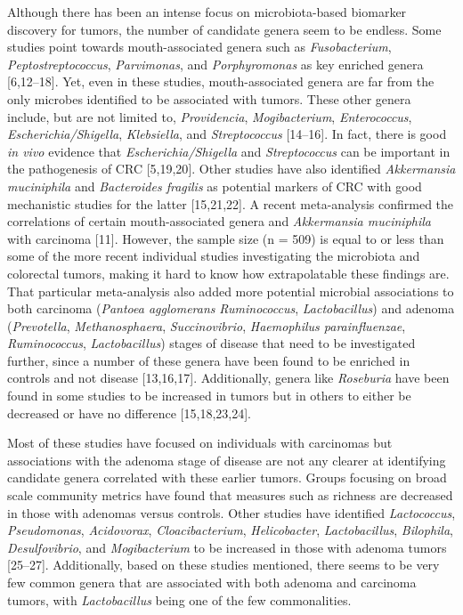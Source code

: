 \documentclass[12pt,]{article}
\begin{document}
Although there has been an intense focus on microbiota-based biomarker
discovery for tumors, the number of candidate genera seem to be endless.
Some studies point towards mouth-associated genera such as
\emph{Fusobacterium}, \emph{Peptostreptococcus}, \emph{Parvimonas}, and
\emph{Porphyromonas} as key enriched genera {[}6,12--18{]}. Yet, even in
these studies, mouth-associated genera are far from the only microbes
identified to be associated with tumors. These other genera include, but
are not limited to, \emph{Providencia}, \emph{Mogibacterium},
\emph{Enterococcus}, \emph{Escherichia/Shigella}, \emph{Klebsiella}, and
\emph{Streptococcus} {[}14--16{]}. In fact, there is good \emph{in vivo}
evidence that \emph{Escherichia/Shigella} and \emph{Streptococcus} can
be important in the pathogenesis of CRC {[}5,19,20{]}. Other studies
have also identified \emph{Akkermansia muciniphila} and
\emph{Bacteroides fragilis} as potential markers of CRC with good
mechanistic studies for the latter {[}15,21,22{]}. A recent
meta-analysis confirmed the correlations of certain mouth-associated
genera and \emph{Akkermansia muciniphila} with carcinoma {[}11{]}.
However, the sample size (n = 509) is equal to or less than some of the
more recent individual studies investigating the microbiota and
colorectal tumors, making it hard to know how extrapolatable these
findings are. That particular meta-analysis also added more potential
microbial associations to both carcinoma (\emph{Pantoea agglomerans}
\emph{Ruminococcus}, \emph{Lactobacillus}) and adenoma
(\emph{Prevotella}, \emph{Methanosphaera}, \emph{Succinovibrio},
\emph{Haemophilus parainfluenzae}, \emph{Ruminococcus},
\emph{Lactobacillus}) stages of disease that need to be investigated
further, since a number of these genera have been found to be enriched
in controls and not disease {[}13,16,17{]}. Additionally, genera like
\emph{Roseburia} have been found in some studies to be increased in
tumors but in others to either be decreased or have no difference
{[}15,18,23,24{]}.

Most of these studies have focused on individuals with carcinomas but
associations with the adenoma stage of disease are not any clearer at
identifying candidate genera correlated with these earlier tumors.
Groups focusing on broad scale community metrics have found that
measures such as richness are decreased in those with adenomas versus
controls. Other studies have identified \emph{Lactococcus},
\emph{Pseudomonas}, \emph{Acidovorax}, \emph{Cloacibacterium},
\emph{Helicobacter}, \emph{Lactobacillus}, \emph{Bilophila},
\emph{Desulfovibrio}, and \emph{Mogibacterium} to be increased in those
with adenoma tumors {[}25--27{]}. Additionally, based on these studies
mentioned, there seems to be very few common genera that are associated
with both adenoma and carcinoma tumors, with \emph{Lactobacillus} being
one of the few commonalities.
\end{document}
